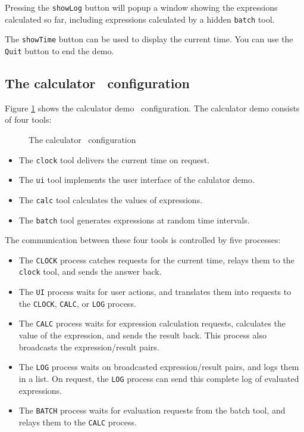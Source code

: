 Pressing the {\tt showLog} button will popup a window showing the
expressions calculated so far, including expressions calculated
by a hidden {\tt batch} tool.


The {\tt showTime} button can be used to display the current time.
You can use the {\tt Quit} button to end the demo.

\subsection{The calculator \TB\ configuration}

Figure \ref{calc-impl} shows the calculator demo \TB\ configuration.
The calculator demo consists of four tools:

\begin{figure}[htb]
\centerline{}
\caption{The calculator \TB\ configuration}
\label{calc-impl}
\end{figure}

\begin{itemize}
\item The {\tt clock} tool delivers the current time on request.
\item The {\tt ui} tool implements the user interface of the calulator demo.
\item The {\tt calc} tool calculates the values of expressions.
\item The {\tt batch} tool generates expressions at random time intervals.
\end{itemize}

The communication between these four tools is controlled by five processes:
\begin{itemize}
\item The {\tt CLOCK} process catches requests for the current time,
      relays them to the {\tt clock} tool, and sends the answer back.
\item The {\tt UI} process waits for user actions, and translates
      them into requests to the {\tt CLOCK}, {\tt CALC}, or {\tt LOG}
      process.
\item The {\tt CALC} process waits for expression calculation requests,
      calculates the value of the expression, and sends the result back.
      This process also broadcasts the expression/result pairs.
\item The {\tt LOG} process waits on broadcasted expression/result pairs,
      and logs them in a list.
      On request, the {\tt LOG} process can send this complete log of
      evaluated expressions.
\item The {\tt BATCH} process waits for evaluation requests from the
      batch tool, and relays them to the {\tt CALC} process.
\end{itemize}

